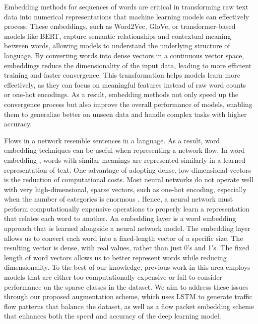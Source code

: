 Embedding methods for sequences of words are critical in transforming raw text data into numerical representations that machine learning models can effectively process. These embeddings, such as Word2Vec, GloVe, or transformer-based models like BERT, capture semantic relationships and contextual meaning between words, allowing models to understand the underlying structure of language. By converting words into dense vectors in a continuous vector space, embeddings reduce the dimensionality of the input data, leading to more efficient training and faster convergence. This transformation helps models learn more effectively, as they can focus on meaningful features instead of raw word counts or one-hot encodings. As a result, embedding methods not only speed up the convergence process but also improve the overall performance of models, enabling them to generalize better on unseen data and handle complex tasks with higher accuracy.

Flows in a network resemble sentences in a language. As a result, word embedding techniques can be useful when representing a network flow. In word embedding \cite{turian2010word}, words with similar meanings are represented similarly in a learned representation of text. One advantage of adopting dense, low-dimensional vectors is the reduction of computational costs. Most neural networks do not operate well with very high-dimensional, sparse vectors, such as one-hot encoding, especially when the number of categories is enormous \cite{li2018slim}. Hence, a neural network must perform computationally expensive operations to properly learn a representation that relates each word to another. An embedding layer \cite{gal2016theoretically} is a word embedding approach that is learned alongside a neural network model. The embedding layer allows us to convert each word into a fixed-length vector of a specific size. The resulting vector is dense, with real values, rather than just 0’s and 1’s. The fixed length of word vectors allows us to better represent words while reducing dimensionality. To the best of our knowledge, previous work in this area employs models that are either too computationally expensive or fail to consider performance on the sparse classes in the dataset. We aim to address these issues through our proposed augmentation scheme, which uses LSTM to generate traffic flow patterns that balance the dataset, as well as a flow packet embedding scheme that enhances both the speed and accuracy of the deep learning model.